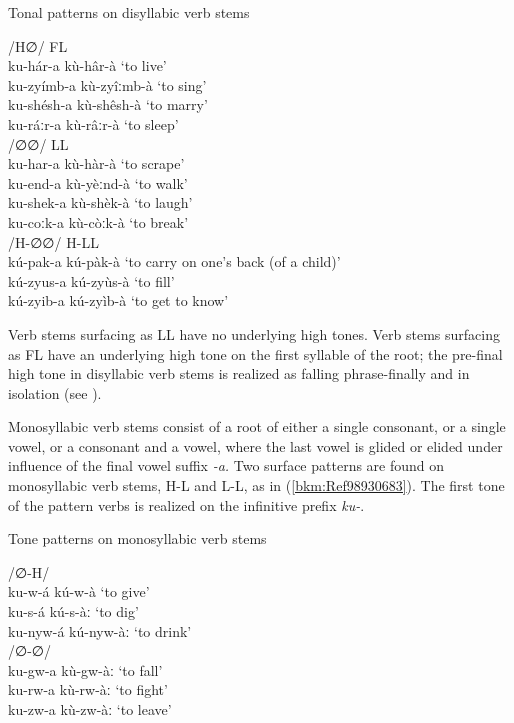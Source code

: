 \ea
\label{bkm:Ref98930522}
  Tonal patterns on disyllabic verb stems

\ea /H∅/ \tab FL \tab \\
ku-hár-a \tab kù-hâr-à \tab ‘to live’\\
ku-zyímb-a \tab kù-zyîːmb-à \tab ‘to sing’\\
ku-shésh-a \tab  kù-shêsh-à \tab ‘to marry’\\
ku-ráːr-a \tab kù-râːr-à \tab ‘to sleep’\\
\ex /∅∅/ \tab LL \tab \\
ku-har-a \tab kù-hàr-à \tab ‘to scrape’\\
ku-end-a \tab kù-yèːnd-à \tab ‘to walk’\\
ku-shek-a \tab kù-shèk-à \tab ‘to laugh’\\
ku-coːk-a \tab kù-còːk-à \tab ‘to break’\\
\ex /H-∅∅/ \tab H-LL \tab \\
kú-pak-a \tab kú-pàk-à \tab ‘to carry on one’s back (of a child)’\\
kú-zyus-a \tab kú-zyùs-à \tab ‘to fill’\\
kú-zyib-a \tab kú-zyìb-à \tab ‘to get to know’\\
\z\z

Verb stems surfacing as LL have no underlying high tones. Verb stems surfacing as FL have an underlying high tone on the first syllable of the root; the pre-final high tone in disyl\-labic verb stems is realized as falling phrase-finally and in isolation (see ).

Monosyllabic verb stems consist of a root of either a single consonant, or a single vowel, or a consonant and a vowel, where the last vowel is glided or elided under influence of the final vowel suffix \textit{-a.} Two surface patterns are found on monosyllabic verb stems, H-L and L-L, as in (\ref{bkm:Ref98930683}). The first tone of the pattern verbs is realized on the infinitive prefix \textit{ku-}.

\ea
\label{bkm:Ref98930683}
  Tone patterns on monosyllabic verb stems

\ea /∅-H/ \tab [H-L] \tab \\
ku-w-á \tab kú-w-à \tab ‘to give’\\
ku-s-á \tab kú-s-àː \tab ‘to dig’\\
ku-nyw-á \tab kú-nyw-àː \tab ‘to drink’\\
\ex /∅-∅/ \tab [L-L] \tab \\
ku-gw-a \tab kù-gw-àː \tab ‘to fall’\\
ku-rw-a \tab kù-rw-àː \tab ‘to fight’\\
ku-zw-a \tab kù-zw-àː \tab ‘to leave’\\
\z\z

